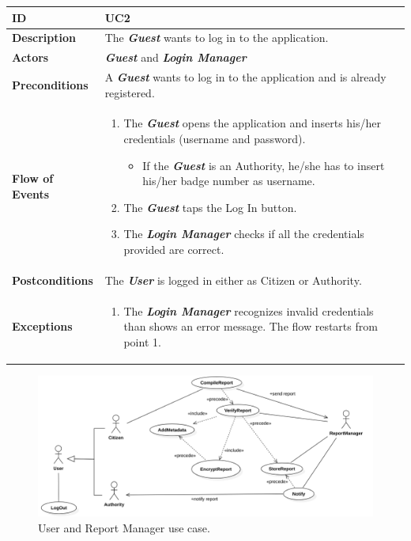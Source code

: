\documentclass{report}
\begin{document}
\begin{tabularx}{\linewidth}{| l | X |}
	\hline
	\textbf{ID} & UC2\\
	
	\hline
	\textbf{Description} & The \textbf{\textit{Guest}} wants to log in to the application.\\
	
	\hline
	\textbf{Actors} & \textbf{\textit{Guest}} and \textbf{\textit{Login Manager}} \\
	
	\hline
	\textbf{Preconditions} & A \textbf{\textit{Guest}} wants to log in to the application and is already registered.\\
	
	\hline
	\textbf{Flow of Events} & \parbox{0.7\textwidth}{
		\begin{enumerate}
			\item The \textbf{\textit{Guest}} opens the application and inserts his/her credentials (username and password).
			\begin{itemize}
				\item If the \textbf{\textit{Guest}} is an Authority, he/she has to insert his/her badge number as username.
			\end{itemize}
			\item The \textbf{\textit{Guest}} taps the Log In button.			
			\item The \textbf{\textit{Login Manager}} checks if all the credentials provided are correct.
	\end{enumerate}}\\
	
	\hline
	\textbf{Postconditions} & The \textbf{\textit{User}} is logged in either as Citizen or Authority.\\
	
	\hline
	\textbf{Exceptions} & \parbox{0.7\textwidth}{ 
		\begin{enumerate}
			\item The \textbf{\textit{Login Manager}} recognizes invalid credentials than shows an error message. The flow restarts from point 1. 
		\end{enumerate}}\\
	
	\hline
\end{tabularx}
\begin{figure}[ht!]
\begin{center}
\includegraphics[width=\textwidth]{./img/UseCase2.png}
\end{center}
\caption{User and Report Manager use case.}
\label{fig:UseCase2}
\end{figure}
\end{document}
